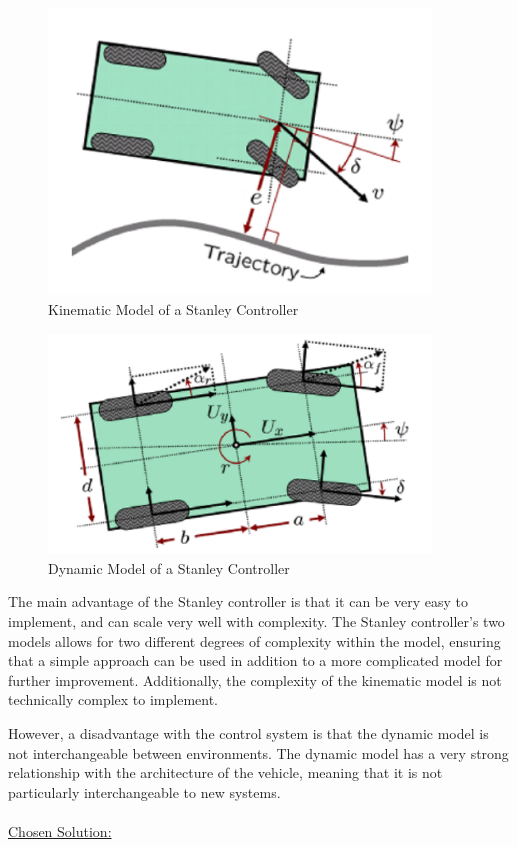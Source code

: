 \documentclass[titlepage,draft]{article}
\begin{document}
{\begin{figure}
	\centering
	\includegraphics[width=4in]{stanley_kinematic}
	\caption{Kinematic Model of a Stanley Controller\cite{4282788}}
	\label{fig:stankine}
\end{figure}

\begin{figure}
	\centering
	\includegraphics[width=4in]{stanley_dynamic}
	\caption{Dynamic Model of a Stanley Controller\cite{4282788}}
	\label{fig:standyna}
\end{figure}

The main advantage of the Stanley controller is that it can be very easy to implement, and can scale very well with complexity. The Stanley controller's two models allows for two different degrees of complexity within the model, ensuring that a simple approach can be used in addition to a more complicated model for further improvement. Additionally, the complexity of the kinematic model is not technically complex to implement.

However, a disadvantage with the control system is that the dynamic model is not interchangeable between environments. The dynamic model has a very strong relationship with the architecture of the vehicle, meaning that it is not particularly interchangeable to new systems. \\~\\
\underline{Chosen Solution:}

}
\end{document}
